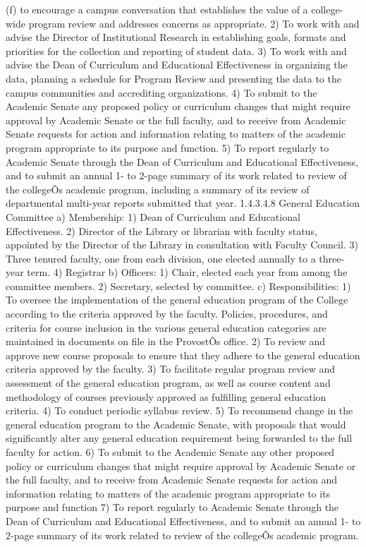 \documentclass[letterpaper, 11pt]{article}
\begin{document}
				(f) to encourage a campus conversation that establishes the value of a college-wide program review and addresses concerns as appropriate.
				2) To work with and advise the Director of Institutional Research in establishing goals, formats and priorities for the collection and reporting of student data.
				3) To work with and advise the Dean of Curriculum and Educational Effectiveness in organizing the data, planning a schedule for Program Review and presenting the data to the campus communities and accrediting organizations.
				4) To submit to the Academic Senate any proposed policy or curriculum changes that might require approval by Academic Senate or the full faculty, and to receive from Academic Senate requests for action and information relating to matters of the academic program appropriate to its purpose and function.
				5) To report regularly to Academic Senate through the Dean of Curriculum and Educational Effectiveness, and to submit an annual 1- to 2-page summary of its work related to review of the collegeÕs academic program, including a summary of its review of departmental multi-year reports submitted that year.
				1.4.3.4.8 General Education Committee
				a) Membership:
				1) Dean of Curriculum and Educational Effectiveness.
				2) Director of the Library or librarian with faculty status, appointed by the Director of the Library in consultation with Faculty Council.
				3) Three tenured faculty, one from each division, one elected annually to a three-year term.
				4) Registrar
				b) Officers:
				1) Chair, elected each year from among the committee members.
				2) Secretary, selected by committee.
				c) Responsibilities:
				1) To oversee the implementation of the general education program of the College according to the criteria approved by the faculty.  Policies, procedures, and criteria for course inclusion in the various general education categories are maintained in documents on file in the ProvostÕs office.
				2) To review and approve new course proposals to ensure that they adhere to the general education criteria approved by the faculty.
				3) To facilitate regular program review and assessment of the general education program, as well as course content and methodology of courses previously approved as fulfilling general education criteria.
				4) To conduct periodic syllabus review.
				5) To recommend change in the general education program to the Academic Senate, with proposals that would significantly alter any general education requirement being forwarded to the full faculty for action.
				6) To submit to the Academic Senate any other proposed policy or curriculum changes that might require approval by Academic Senate or the full faculty, and to receive from Academic Senate requests for action and information relating to matters of the academic program appropriate to its purpose and function
				7) To report regularly to Academic Senate through the Dean of Curriculum and Educational Effectiveness, and to submit an annual 1- to 2-page summary of its work related to review of the collegeÕs academic program.
\end{document}

